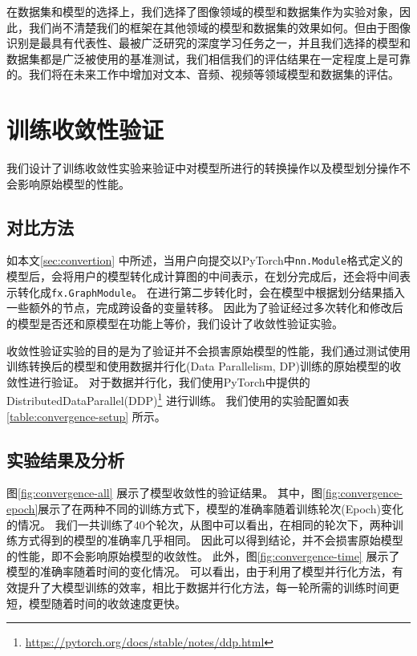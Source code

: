 在数据集和模型的选择上，我们选择了图像领域的模型和数据集作为实验对象，因此，我们尚不清楚我们的框架在其他领域的模型和数据集的效果如何。但由于图像识别是最具有代表性、最被广泛研究的深度学习任务之一，并且我们选择的模型和数据集都是广泛被使用的基准测试，我们相信我们的评估结果在一定程度上是可靠的。我们将在未来工作中增加对文本、音频、视频等领域模型和数据集的评估。


\section{训练收敛性验证}
\label{sec:convergence}
我们设计了训练收敛性实验来验证\sys{}中对模型所进行的转换操作以及模型划分操作不会影响原始模型的性能。

\subsection{对比方法}


如本文\ref{sec:convertion} 中所述，当用户向\sys{}提交以PyTorch中\texttt{nn.Module}格式定义的模型后，\sys{}会将用户的模型转化成计算图的中间表示，在划分完成后，\sys{}还会将中间表示转化成\texttt{fx.GraphModule}。
在进行第二步转化时，会在模型中根据划分结果插入一些额外的节点，完成跨设备的变量转移。
因此为了验证经过多次转化和修改后的模型是否还和原模型在功能上等价，我们设计了收敛性验证实验。

收敛性验证实验的目的是为了验证\sys{}并不会损害原始模型的性能，我们通过测试使用\sys{}训练转换后的模型和使用数据并行化(Data Parallelism, DP)训练的原始模型的收敛性进行验证。
对于数据并行化，我们使用PyTorch中提供的DistributedDataParallel(DDP)\footnote{\url{https://pytorch.org/docs/stable/notes/ddp.html}} 进行训练。
我们使用的实验配置如表\ref{table:convergence-setup} 所示。


\subsection{实验结果及分析}

图\ref{fig:convergence-all} 展示了模型收敛性的验证结果。
其中，图\ref{fig:convergence-epoch}展示了在两种不同的训练方式下，模型的准确率随着训练轮次(Epoch)变化的情况。
我们一共训练了40个轮次，从图中可以看出，在相同的轮次下，两种训练方式得到的模型的准确率几乎相同。
因此可以得到结论，\sys{}并不会损害原始模型的性能，即不会影响原始模型的收敛性。
此外，图\ref{fig:convergence-time} 展示了模型的准确率随着时间的变化情况。
可以看出，由于\sys{}利用了模型并行化方法，有效提升了大模型训练的效率，相比于数据并行化方法，每一轮所需的训练时间更短，模型随着时间的收敛速度更快。

